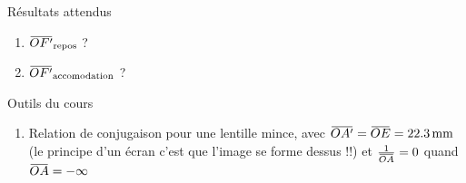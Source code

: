 \documentclass[10pt,a5paper,notitlepage]{book}
\begin{document}
\begin{NCprop}{Résultats attendus}
    \begin{enumerate}
        \item $\OF \St{repos}$ ?
        \item $\OF \St{accomodation}$ ?
    \end{enumerate}
\end{NCprop}

\begin{NCdemo}{Outils du cours}
   \begin{enumerate}
       \item Relation de conjugaison pour une lentille mince, avec $\OAp =
           \obar{OE} = \SI{22.3}{mm}$ (le principe d'un écran c'est que l'image
           se forme dessus !!) et $\frac{1}{\OA} = 0$ quand $\OA =
           -\infty$
   \end{enumerate} 
\end{NCdemo}
\end{document}
